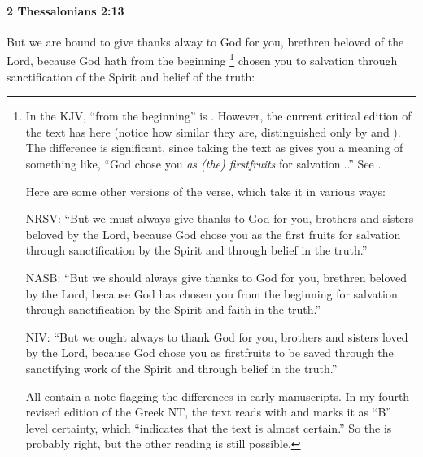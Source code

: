 		\paragraph{2 Thessalonians 2:13} %
			\label{2THESSALONIANS-2-13}

			But we are bound to give thanks alway to God for you, brethren beloved of the Lord, because God hath from the beginning%
				\footnote{%
					\label{2THESSALONIANS-2-13-NOTE-beginning}%
					In the KJV, ``from the beginning'' is . However, the current critical edition of the text has  here (notice how similar they are, distinguished only by  and ). The difference is significant, since taking the text as  gives you a meaning of something like, ``God chose you \textit{as (the) firstfruits} for salvation...'' See \hyperref[APARCHE]{}.
					
					Here are some other versions of the verse, which take it in various ways:
					
					NRSV: ``But we must always give thanks to God for you, brothers and sisters beloved by the Lord, because God chose you as the first fruits for salvation through sanctification by the Spirit and through belief in the truth.''
					
					NASB: ``But we should always give thanks to God for you, brethren beloved by the Lord, because God has chosen you from the beginning for salvation through sanctification by the Spirit and faith in the truth.''
					
					NIV: ``But we ought always to thank God for you, brothers and sisters loved by the Lord, because God chose you as firstfruits to be saved through the sanctifying work of the Spirit and through belief in the truth.''
					
					All contain a note flagging the differences in early manuscripts. In my fourth revised edition of the Greek NT, the text reads with  and marks it as ``B'' level certainty, which ``indicates that the text is almost certain.'' So the  is probably right, but the other reading is still possible.
					}
			chosen you to salvation through sanctification of the Spirit and belief of the truth:

